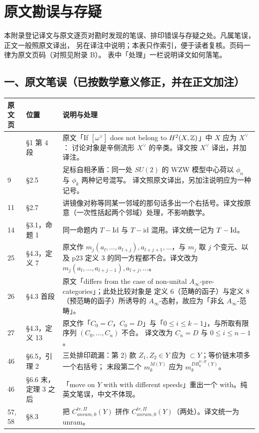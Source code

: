 \section{原文勘误与存疑}

本附录登记译文与原文逐页对勘时发现的笔误、排印错误与存疑之处。凡属笔误，正文一般照原文译出，
另在译注中说明；本表只作索引，便于读者复核。页码一律为原文页码（对照见附录 B）。
表中「处理」一栏说明译文如何落笔。

\subsection*{一、原文笔误（已按数学意义修正，并在正文加注）}

\begin{longtable}{@{}p{}p{}p{}@{}}
\toprule
\textbf{原文页} & \textbf{位置} & \textbf{说明与处理} \\
\midrule
\endhead
\bottomrule
\endfoot
1 & \S1 第 4 段 & 原文「If $[\omega^{\vee}]$ does not belong to $H^2(X,\mathbb{Z})$」中 $X$ 应为 $X^{\vee}$：
讨论对象是辛侧流形 $X^{\vee}$ 的辛类。译文按 $X^{\vee}$ 译出，并加译注。\\
9 & \S2.5 & 足标自相矛盾：同一处 $SU(2)$ 的 WZW 模型中心荷以 $\phi_n$ 与 $\phi_k$ 两种记号混写。
译文照原文译出，另加注说明应为一种记号。\\
11 & \S2.7 & 讲镜像对称等同某一邻域的那句话多出一个右括号。译文按原意（一次性括起两个邻域）处理，不影响数学。\\
14 & \S3.1，命题 1 & 同一命题内 $T-\mathrm{Id}$ 与 $T-\mathrm{id}$ 混用。译文统一记为 $T-\mathrm{Id}$。\\
25 & \S4.3，定义 7 & 原文作 $m_j(a_l,\dots,a_{l+j}),a_{l+j+1},\dots$，与 $m_j$ 取 $j$ 个变元、以及
p23 定义 3 的同一方程都不合。译文改为 $m_j(a_l,\dots,a_{l+j-1}),a_{l+j},\dots$。\\
26 & \S4.3 首段 & 原文「differs from the case of non-unital $A_\infty$-pre-categories」；此处比较对象是
定义 6（范畴的函子）与定义 8（预范畴的函子）所诱导的 $A_\infty$-态射，故应为「非幺 $A_\infty$-范畴」。\\
27 & \S4.3，定义 13 & 原文作「$C_0=C$，$C_0=D$」与「$0\le i\le k-1$」，与所取有限序列 $(C_0,\dots,C_n)$ 不合。
译文改为 $C_n=D$ 与 $0\le i\le n-1$。\\
46 & \S6.5，引理 2 & 三处排印疏漏：第 2) 款 $Z_1,Z_2\in Y$ 应为 $\subset Y$；等价链末项多一个右括号；
末段第二个 $m_k^{M(Y)}$ 应为 $m_k^{DR_0^{tr,\Pi}(Y)}$。\\
46 & \S6.6 末，定理 3 之后 & 「move on $Y$ with with different speeds」重出一个 with。纯英文笔误，中文不体现。\\
57, 58 & \S8.3 & 把 $C^{tr,\Pi}_{unram,0}(Y)$ 拼作 $C^{tr,\Pi}_{unrum,0}(Y)$（两处）。译文统一为 unram。\\
\end{longtable}

